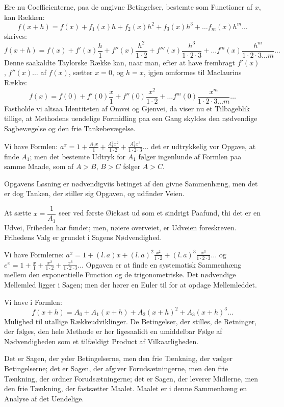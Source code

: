 \documentclass[12pt]{book}
\newcommand{\opage}[1]{\marginnote{\footnotesize\textit{[#1]}}}
\begin{document}
Ere nu Coefficienterne, paa de angivne Betingelser, bestemte som Functioner af
$x$, kan Rækken:
\[
f(x+h) = f(x) + f_1(x)h + f_2(x)h^{2} + f_3(x)h^{3} + \dots f_m(x)h^{m}\dots
\]
skrives:
\[
f(x+h) = f(x) + f'(x)\frac{h}{1} + f''(x)\frac{h^{2}}{1\cdot 2}
+ f'''(x)\frac{h^{3}}{1\cdot 2\cdot 3} + \dots
f^{m}(x)\frac{h^{m}}{1\cdot 2\cdot 3\dots m}\dots
\]
Denne saakaldte Taylorske Række kan, naar man, efter at have frembragt $f'(x)$,
$f''(x)\dots$ af $f(x)$, sætter $x = 0$, og $h = x$, igjen omformes til Maclaurins
Række:
\[
f(x) = f(0) + f'(0)\frac{x}{1} + f''(0)\frac{x^{2}}{1\cdot 2} + \dots
f^{m}(0)\frac{x^{m}}{1\cdot 2\cdot 3\dots m}\dots
\]
Fastholde vi altsaa Identiteten af Omvei og Gjenvei, da viser nu et Tilbageblik
tillige, at Methodens uendelige Formidling paa een Gang skyldes den nødvendige
Sagbevægelse og den frie Tankebevægelse.

Vi have Formlen: $a^{x} = 1 + \frac{A_1 x}{1} + \frac{A_1^{2}x^{2}}{1\cdot 2}
+ \frac{A_1^{3}x^{3}}{1\cdot 2\cdot 3}\dots$ det er udtrykkelig vor Opgave, at
finde $A_1$; men det bestemte Udtryk for $A_1$ følger ingenlunde af Formlen paa
samme Maade, som af $A > B$, $B > C$ følger $A > C$.

Opgavens Løsning er nødvendigviis betinget af den givne Sammenhæng, men det er
dog Tanken, der stiller sig Opgaven, og udfinder Veien.

\opage{46} At sætte $x = \dfrac{1}{A_1}$ seer ved første Øiekast ud som et sindrigt Paafund,
thi det er en Udvei, Friheden har fundet; men, nøiere overveiet, er Udveien
foreskreven. Frihedens Valg er grundet i Sagens Nødvendighed.

Vi have Formlerne: $a^{x} = 1 + (l.\,a)x + (l.\,a)^{2}\frac{x^{2}}{1\cdot 2}
+ (l.\,a)^{3}\frac{x^{3}}{1\cdot 2\cdot 3}\dots$ og
$e^{x} = 1 + \frac{x}{1} + \frac{x^{2}}{1\cdot 2} + \frac{x^{3}}{1\cdot 2\cdot 3}
\dots$ Opgaven er at finde en systematisk Sammenhæng mellem den exponentielle
Function og de trigonometriske. Det nødvendige Mellemled ligger i Sagen; men der
hører en Euler til for at opdage Mellemleddet.

Vi have i Formlen:
\[
f(x+h) = A_0 + A_1(x+h) + A_2(x+h)^{2} + A_3(x+h)^{3}\dots
\]
Mulighed til utallige Rækkeudviklinger. De Betingelser, der stilles, de
Retninger, der følges, den hele Methode er her ligesaalidt en umiddelbar Følge af
Nødvendigheden som et tilfældigt Product af Vilkaarligheden.

Det er Sagen, der yder Betingelserne, men den frie Tænkning, der vælger
Betingelserne; det er Sagen, der afgiver Forudsætningerne, men den frie Tænkning,
der ordner Forudsætningerne; det er Sagen, der leverer Midlerne, men den frie
Tænkning, der fastsætter Maalet. Maalet er i denne Sammenhæng en Analyse af det
Uendelige.
\end{document}
